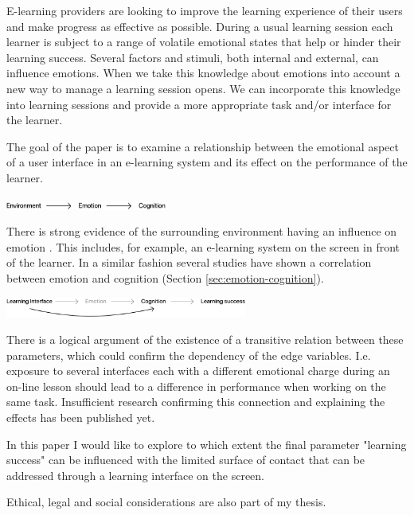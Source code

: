 E-learning providers are looking to improve the learning experience of their users and make progress as effective as possible. 
During a usual learning session each learner is subject to a range of volatile emotional states that help or hinder their learning success. 
Several factors and stimuli, both internal and external, can influence emotions. 
When we take this knowledge about emotions into account a new way to manage a learning session opens. We can incorporate this knowledge into learning sessions and provide a more appropriate task and/or interface for the learner.

The goal of the paper is to examine a relationship between the emotional aspect of a user interface in an e-learning system and its effect on the performance of the learner.


\begin{center}
	\includegraphics[width=200px]{graphics/relation1.png}
\end{center}
 
There is strong evidence of the surrounding environment having an influence on emotion \cite{Johnson2000, Arockiam2013, Bertamini2013}. This includes, for example, an e-learning system on the screen in front of the learner. In a similar fashion several studies have shown a correlation between emotion and cognition (Section \ref{sec:emotion-cognition}).

\begin{center}
\includegraphics[width=300px]{graphics/relation2.png}
\end{center}

There is a logical argument of the existence of a transitive relation between these parameters, which could confirm the dependency of the edge variables. 
I.e. exposure to several interfaces each with a different emotional charge during an on-line lesson should lead to a difference in performance when working on the same task.
Insufficient research confirming this connection and explaining the effects has been published yet. 

In this paper I would like to explore to which extent the final parameter "learning success" can be influenced with the limited surface of contact that can be addressed through a learning interface on the screen.

Ethical, legal and social considerations are also part of my thesis.